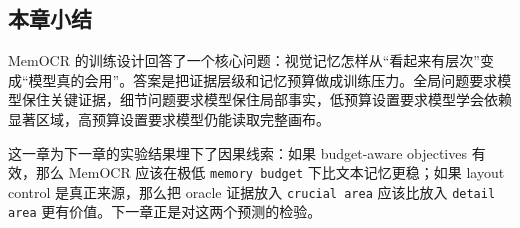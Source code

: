 \subsection{本章小结}

MemOCR 的训练设计回答了一个核心问题：视觉记忆怎样从“看起来有层次”变成“模型真的会用”。答案是把证据层级和记忆预算做成训练压力。全局问题要求模型保住关键证据，细节问题要求模型保住局部事实，低预算设置要求模型学会依赖显著区域，高预算设置要求模型仍能读取完整画布。

这一章为下一章的实验结果埋下了因果线索：如果 budget-aware objectives 有效，那么 MemOCR 应该在极低 \texttt{memory budget} 下比文本记忆更稳；如果 layout control 是真正来源，那么把 oracle 证据放入 \texttt{crucial area} 应该比放入 \texttt{detail area} 更有价值。下一章正是对这两个预测的检验。
